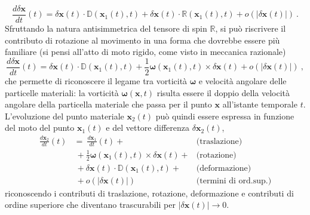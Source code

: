 \documentclass[11pt,fleqn]{article}
\begin{document}
\begin{equation}
    \frac{d \delta \bm{x}}{d t}(t) = \delta \bm{x}(t) \cdot \mathbb{D}(\bm{x}_1(t),t) +
                                     \delta \bm{x}(t) \cdot \mathbb{R}(\bm{x}_1(t),t) + o(|\delta\bm{x}(t)|) \ .
\end{equation}
Sfruttando la natura antisimmetrica del tensore di spin $\mathbb{R}$, si può riscrivere il contributo di rotazione al movimento in una forma che dovrebbe essere più familiare (si pensi all'atto di moto rigido, come visto in meccanica razionale)
\begin{equation}
    \frac{d \delta \bm{x}}{d t}(t) = \delta \bm{x}(t) \cdot \mathbb{D}(\bm{x}_1(t),t) + 
    \frac{1}{2} \bm{\omega}(\bm{x}_1(t),t) \times \delta \bm{x}(t) + o(|\delta\bm{x}(t)|) \ ,
\end{equation}
che permette di riconoscere il legame tra vorticità $\bm{\omega}$ e velocità angolare delle particelle materiali: la vorticità $\bm{\omega}(\bm{x},t)$ risulta essere il doppio della velocità angolare della particella materiale che passa per il punto $\bm{x}$ all'istante temporale $t$.
\newline \noindent
L'evoluzione del punto materiale $\bm{x}_2(t)$ può quindi essere espressa in funzione del moto del punto $\bm{x}_1(t)$ e del vettore differenza $\delta\bm{x}_2(t)$,
\begin{equation}
\begin{aligned}
    \frac{d\bm{x}_2}{d t}(t) & = \ \frac{d\bm{x}_1}{d t}(t) + & \text{(traslazione)} \\
    & \ + \frac{1}{2} \bm{\omega}(\bm{x}_1(t),t) \times \delta \bm{x}(t) + & \text{(rotazione)} \\
    & \ + \delta \bm{x}(t) \cdot \mathbb{D}(\bm{x}_1(t),t) + & \text{(deformazione)} \\
    & \ + o(|\delta\bm{x}(t)|) & \text{(termini di ord.sup.)}
\end{aligned}
\end{equation}
riconoscendo i contributi di traslazione, rotazione, deformazione e contributi di ordine superiore che diventano trascurabili per $|\delta\bm{x}(t)| \rightarrow 0$.
\end{document}

